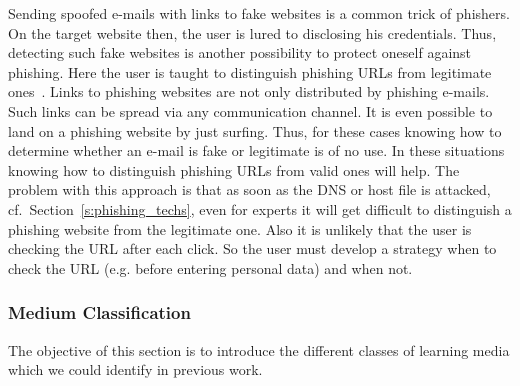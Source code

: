 \begin{description}[leftmargin=0cm]
	\item[URL Based Knowledge] Sending spoofed e-mails with links to fake websites is a common trick of phishers.
 On the target website then, the user is lured to disclosing his credentials.
 Thus, detecting such fake websites is another possibility to protect oneself against phishing.
 Here the user is taught to distinguish phishing URLs from legitimate ones~\cite{sheng2007antiphishingphil, arachchilage2012designing}. Links to phishing websites are not only distributed by phishing e-mails.
 Such links can be spread via any communication channel.
 It is even possible to land on a phishing website by just surfing.
 Thus, for these cases knowing how to determine whether an e-mail is fake or legitimate is of no use.
 In these situations knowing how to distinguish phishing URLs from valid ones will help.
 The problem with this approach is that as soon as the DNS or host file is attacked, cf.~Section~\ref{s:phishing_techs}, even for experts it will get difficult to distinguish a phishing website from the legitimate one.
 Also it is unlikely that the user is checking the URL after each click. So the user must develop a strategy when to check the URL (e.g. before entering personal data) and when not.

\end{description}


\subsubsection{Medium Classification}
The objective of this section is to introduce the different classes of learning media which we could identify in previous work.

